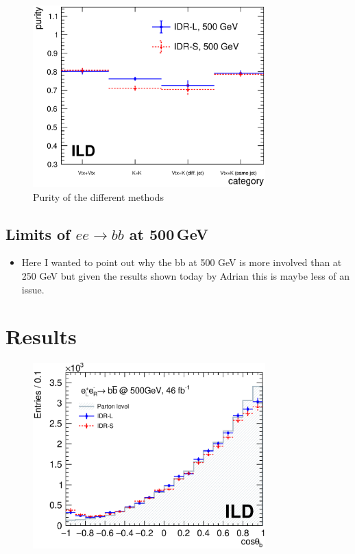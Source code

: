 \documentclass[preprint]{elsarticle}
\begin{document}
\begin{itemize}
\begin{figure}[h!]
\centering
  \includegraphics[width=0.8\textwidth]{figures_BBbar/purity_v2.eps} 
\caption{Purity of the different methods}
\label{purity_bb}
\end{figure}



\end{itemize}




\subsection{Limits of $ee\rightarrow bb$ at 500\,GeV}

\begin{itemize}
\item Here I wanted to point out why the bb at 500 GeV is more involved than at 250 GeV but given the results shown today by Adrian this is maybe less of an issue.
\end{itemize}


\section{Results}
 
 \begin{figure}[h!]
\centering
  \includegraphics[width=0.8\textwidth]{figures_BBbar/result2models_v2.eps} 
\caption{}
\label{results_bb}
\end{figure}
\end{document}
